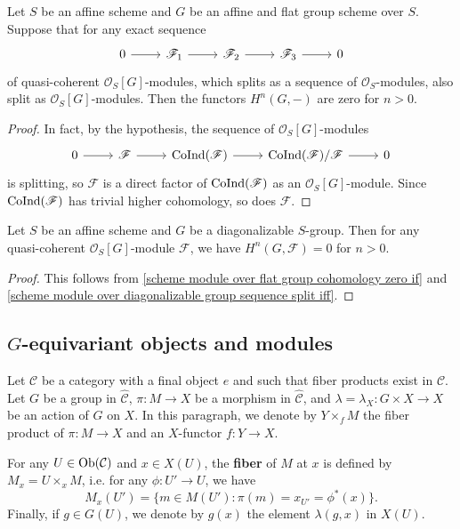 \begin{proposition}\label{scheme module over flat group cohomology zero if}
Let $S$ be an affine scheme and $G$ be an affine and flat group scheme over $S$. Suppose that for any exact sequence
\[\begin{tikzcd}
0\ar[r]&\mathscr{F}_1\ar[r]&\mathscr{F}_2\ar[r]&\mathscr{F}_3\ar[r]&0
\end{tikzcd}\]
of quasi-coherent $\mathscr{O}_S[G]$-modules, which splits as a sequence of $\mathscr{O}_S$-modules, also split as $\mathscr{O}_S[G]$-modules. Then the functors $H^n(G,-)$ are zero for $n>0$.
\end{proposition}
\begin{proof}
In fact, by the hypothesis, the sequence of $\mathscr{O}_S[G]$-modules
\[\begin{tikzcd}
0\ar[r]&\mathscr{F}\ar[r]&\CoInd(\mathscr{F})\ar[r]&\CoInd(\mathscr{F})/\mathscr{F}\ar[r]&0
\end{tikzcd}\]
is splitting, so $\mathscr{F}$ is a direct factor of $\mathrm{CoInd}(\mathscr{F})$ as an $\mathscr{O}_S[G]$-module. Since $\mathrm{CoInd}(\mathscr{F})$ has trivial higher cohomology, so does $\mathscr{F}$.
\end{proof}

\begin{theorem}\label{scheme module over diagonalizable group cohomology zero}
Let $S$ be an affine scheme and $G$ be a diagonalizable $S$-group. Then for any quasi-coherent $\mathscr{O}_S[G]$-module $\mathscr{F}$, we have $H^n(G,\mathscr{F})=0$ for $n>0$.
\end{theorem}
\begin{proof}
This follows from \cref{scheme module over flat group cohomology zero if} and \cref{scheme module over diagonalizable group sequence split iff}.
\end{proof}

\subsection{\texorpdfstring{$G$}{G}-equivariant objects and modules}
Let $\mathcal{C}$ be a category with a final object $e$ and such that fiber products exist in $\mathcal{C}$. Let $G$ be a group in $\widehat{\mathcal{C}}$, $\pi:M\to X$ be a morphism in $\widehat{\mathcal{C}}$, and $\lambda=\lambda_X:G\times X\to X$ be an action of $G$ on $X$. In this paragraph, we denote by $Y\times_fM$ the fiber product of $\pi:M\to X$ and an $X$-functor $f:Y\to X$.\par
For any $U\in\mathrm{Ob}(\mathcal{C})$ and $x\in X(U)$, the \textbf{fiber} of $M$ at $x$ is defined by $M_x=U\times_xM$, i.e. for any $\phi:U'\to U$, we have
\[M_x(U')=\{m\in M(U'):\pi(m)=x_{U'}=\phi^*(x)\}.\]
Finally, if $g\in G(U)$, we denote by $g(x)$ the element $\lambda(g,x)$ in $X(U)$.

